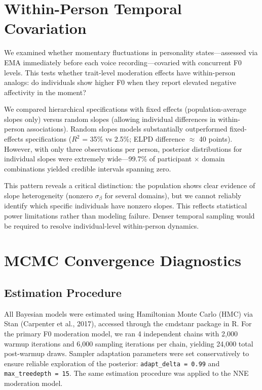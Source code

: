 \documentclass[
  english,
  man,floatsintext]{apa6}
\begin{document}
\newpage

\section{Within-Person Temporal Covariation}\label{within-person-temporal-covariation}

We examined whether momentary fluctuations in personality states---assessed via EMA immediately before each voice recording---covaried with concurrent F0 levels. This tests whether trait-level moderation effects have within-person analogs: do individuals show higher F0 when they report elevated negative affectivity in the moment?

We compared hierarchical specifications with fixed effects (population-average slopes only) versus random slopes (allowing individual differences in within-person associations). Random slopes models substantially outperformed fixed-effects specifications (\(R^2\) = 35\% vs 2.5\%; ELPD difference \(\approx\) 40 points). However, with only three observations per person, posterior distributions for individual slopes were extremely wide---99.7\% of participant × domain combinations yielded credible intervals spanning zero.

This pattern reveals a critical distinction: the population shows clear evidence of slope heterogeneity (nonzero \(\sigma_\beta\) for several domains), but we cannot reliably identify which specific individuals have nonzero slopes. This reflects statistical power limitations rather than modeling failure. Denser temporal sampling would be required to resolve individual-level within-person dynamics.

\newpage

\section{MCMC Convergence Diagnostics}\label{mcmc-convergence-diagnostics}

\subsection{Estimation Procedure}\label{estimation-procedure}

All Bayesian models were estimated using Hamiltonian Monte Carlo (HMC) via Stan (Carpenter et al., 2017), accessed through the cmdstanr package in R. For the primary F0 moderation model, we ran 4 independent chains with 2,000 warmup iterations and 6,000 sampling iterations per chain, yielding 24,000 total post-warmup draws. Sampler adaptation parameters were set conservatively to ensure reliable exploration of the posterior: \texttt{adapt\_delta\ =\ 0.99} and \texttt{max\_treedepth\ =\ 15}. The same estimation procedure was applied to the NNE moderation model.
\end{document}
